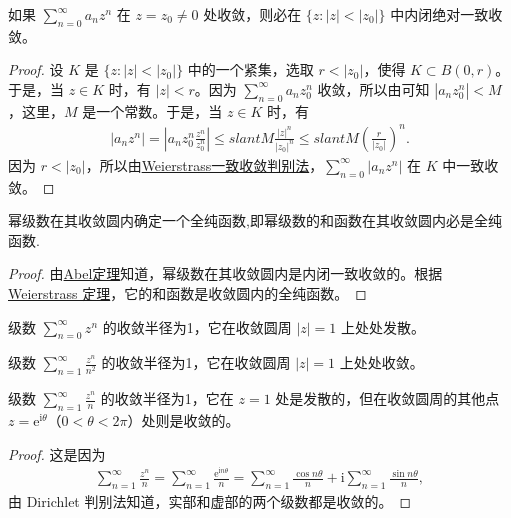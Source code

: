 \documentclass[../../main.tex]{subfiles}
\begin{document}
\begin{theorem}[Abel定理]\label{theorem:Abel定理-定理4.2.3}
如果 \( \sum_{n=0}^{\infty} a_n z^n \) 在 \( z = z_0 \neq 0 \) 处收敛，则必在 \( \{z : |z| < |z_0|\} \) 中内闭绝对一致收敛。
\end{theorem}
\begin{proof}
设 \( K \) 是 \( \{z : |z| < |z_0|\} \) 中的一个紧集，选取 \( r < |z_0| \)，使得 \( K \subset B(0, r) \)。于是，当 \( z \in K \) 时，有 \( |z| < r \)。因为 \( \sum_{n=0}^{\infty} a_n z_0^n \) 收敛，所以由可知 \( |a_n z_0^n| < M \)，这里，\( M \) 是一个常数。于是，当 \( z \in K \) 时，有
\begin{align*}
|a_n z^n| = \left| a_n z_0^n \frac{z^n}{z_0^n} \right| \leqslant slant M \frac{|z|^n}{|z_0|^n} \leqslant slant M \left( \frac{r}{|z_0|} \right)^n.
\end{align*}
因为 \( r < |z_0| \)，所以由\hyperref[theorem:Weierstrass一致收敛判别法]{Weierstrass一致收敛判别法}，\( \sum_{n=0}^{\infty} |a_n z^n| \) 在 \( K \) 中一致收敛。
\end{proof}

\begin{theorem}\label{theorem:定理4.2.4}
幂级数在其收敛圆内确定一个全纯函数,即幂级数的和函数在其收敛圆内必是全纯函数.
\end{theorem}
\begin{proof}
由\hyperref[theorem:Abel定理-定理4.2.3]{Abel定理}知道，幂级数在其收敛圆内是内闭一致收敛的。根据 \hyperref[theorem:Weierstrass定理]{Weierstrass 定理}，它的和函数是收敛圆内的全纯函数。
\end{proof}

\begin{example}
级数 \( \sum_{n=0}^{\infty} z^n \) 的收敛半径为1，它在收敛圆周 \( |z| = 1 \) 上处处发散。
\end{example}

\begin{example}
级数 \( \sum_{n=1}^{\infty} \frac{z^n}{n^2} \) 的收敛半径为1，它在收敛圆周 \( |z| = 1 \) 上处处收敛。
\end{example}

\begin{example}
级数 \( \sum_{n=1}^{\infty} \frac{z^n}{n} \) 的收敛半径为1，它在 \( z = 1 \) 处是发散的，但在收敛圆周的其他点 \( z = \mathrm{e}^{\mathrm{i}\theta} \)（\( 0 < \theta < 2\pi \)）处则是收敛的。
\end{example}
\begin{proof}
这是因为
\begin{align*}
\sum_{n=1}^{\infty} \frac{z^n}{n} = \sum_{n=1}^{\infty} \frac{\mathrm{e}^{\mathrm{i}n\theta}}{n} = \sum_{n=1}^{\infty} \frac{\cos n\theta}{n} + \mathrm{i}\sum_{n=1}^{\infty} \frac{\sin n\theta}{n},
\end{align*}
由 Dirichlet 判别法知道，实部和虚部的两个级数都是收敛的。
\end{proof}
\end{document}
